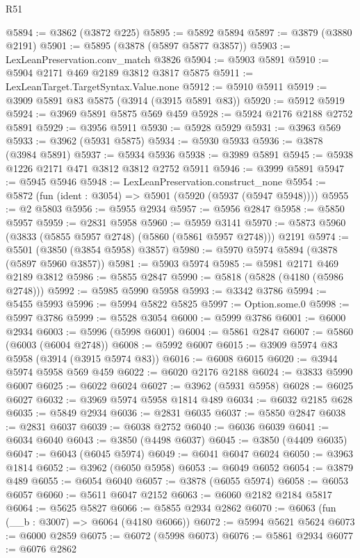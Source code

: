 \begin{lexlean}{R51}
\begin{coremodule}
@5894 := @3862 (@3872 @225)
@5895 := @5892 @5894
@5897 := @3879 (@3880 @2191)
@5901 := @5895 (@3878 (@5897 @5877 @3857))
@5903 := LexLeanPreservation.conv_match @3826
@5904 := @5903 @5891
@5910 := @5904 @2171 @469 @2189 @3812 @3817 @5875
@5911 := LexLeanTarget.TargetSyntax.Value.none
@5912 := @5910 @5911
@5919 := @3909 @5891 @83 @5875 (@3914 (@3915 @5891 @83))
@5920 := @5912 @5919
@5924 := @3969 @5891 @5875 @569 @459
@5928 := @5924 @2176 @2188 @2752 @5891
@5929 := @3956 @5911
@5930 := @5928 @5929
@5931 := @3963 @569
@5933 := @3962 (@5931 @5875)
@5934 := @5930 @5933
@5936 := @3878 (@3984 @5891)
@5937 := @5934 @5936
@5938 := @3989 @5891
@5945 := @5938 @1226 @2171 @471 @3812 @3812 @2752 @5911
@5946 := @3999 @5891
@5947 := @5945 @5946
@5948 := LexLeanPreservation.construct_none
@5954 := @5872 (fun (ident : @3054) => @5901 (@5920 (@5937 (@5947 @5948))))
@5955 := @2 @5803
@5956 := @5955 @2934
@5957 := @5956 @2847
@5958 := @5850 @5957
@5959 := @2831 @5958
@5960 := @5959 @3141
@5970 := @5873 @5960 (@3833 (@5855 @5957 @2748) (@5860 (@5861 @5957 @2748))) @2191
@5974 := @5501 (@3850 (@3854 @5958) @3857)
@5980 := @5970 @5974 @5894 (@3878 (@5897 @5960 @3857))
@5981 := @5903 @5974
@5985 := @5981 @2171 @469 @2189 @3812
@5986 := @5855 @2847
@5990 := @5818 (@5828 (@4180 (@5986 @2748)))
@5992 := @5985 @5990 @5958
@5993 := @3342 @3786
@5994 := @5455 @5993
@5996 := @5994 @5822 @5825
@5997 := Option.some.{0}
@5998 := @5997 @3786
@5999 := @5528 @3054
@6000 := @5999 @3786
@6001 := @6000 @2934
@6003 := @5996 (@5998 @6001)
@6004 := @5861 @2847
@6007 := @5860 (@6003 (@6004 @2748))
@6008 := @5992 @6007
@6015 := @3909 @5974 @83 @5958 (@3914 (@3915 @5974 @83))
@6016 := @6008 @6015
@6020 := @3944 @5974 @5958 @569 @459
@6022 := @6020 @2176 @2188
@6024 := @3833 @5990 @6007
@6025 := @6022 @6024
@6027 := @3962 (@5931 @5958)
@6028 := @6025 @6027
@6032 := @3969 @5974 @5958 @1814 @489
@6034 := @6032 @2185 @628
@6035 := @5849 @2934
@6036 := @2831 @6035
@6037 := @5850 @2847
@6038 := @2831 @6037
@6039 := @6038 @2752
@6040 := @6036 @6039
@6041 := @6034 @6040
@6043 := @3850 (@4498 @6037)
@6045 := @3850 (@4409 @6035)
@6047 := @6043 (@6045 @5974)
@6049 := @6041 @6047 @6024
@6050 := @3963 @1814
@6052 := @3962 (@6050 @5958)
@6053 := @6049 @6052
@6054 := @3879 @489
@6055 := @6054 @6040
@6057 := @3878 (@6055 @5974)
@6058 := @6053 @6057
@6060 := @5611 @6047 @2152
@6063 := @6060 @2182 @2184 @5817
@6064 := @5625 @5827
@6066 := @5855 @2934 @2862
@6070 := @6063 (fun (__b : @3007) => @6064 (@4180 @6066))
@6072 := @5994 @5621 @5624
@6073 := @6000 @2859
@6075 := @6072 (@5998 @6073)
@6076 := @5861 @2934
@6077 := @6076 @2862

\end{coremodule}
\end{lexlean}
